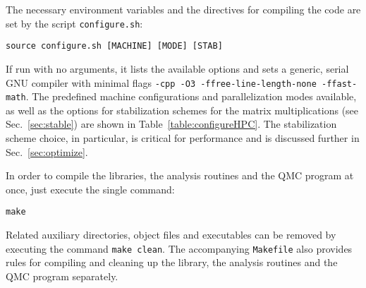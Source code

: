 The necessary environment variables and the directives for compiling the code are set by the script \texttt{configure.sh}:
\begin{lstlisting}[style=bash]
source configure.sh [MACHINE] [MODE] [STAB]
\end{lstlisting}
If run with no arguments, it lists the available options and sets a generic, serial GNU compiler with minimal flags \texttt{-cpp -O3 -ffree-line-length-none -ffast-math}. The predefined machine configurations and parallelization modes available, as well as the options for stabilization schemes for the matrix multiplications (see Sec.~\ref{sec:stable}) are shown in Table~\ref{table:configureHPC}. The stabilization scheme choice, in particular, is critical for performance and is discussed further in Sec.~\ref{sec:optimize}.

In order to compile the libraries, the analysis routines and the QMC program at once, just execute the single command:%
\begin{lstlisting}[style=bash,morekeywords={make}]
make
\end{lstlisting}
Related auxiliary directories, object files and executables can be removed by executing the command \lstinline[style=bash,morekeywords={make}]{make clean}. The accompanying \texttt{Makefile} also provides rules for compiling and cleaning up the library, the analysis routines and the QMC program separately.  

